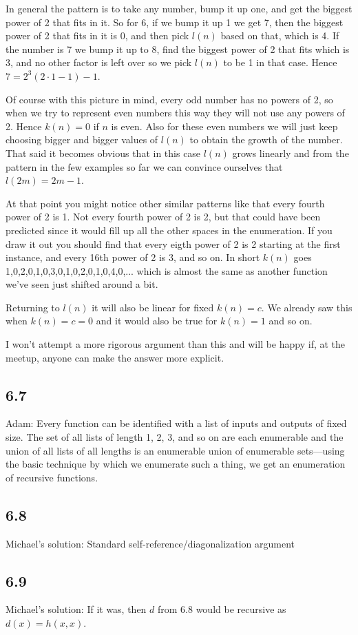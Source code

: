 \documentclass{article}
\renewcommand\ss{\subsection*}
\newcommand\ms{Michael's solution: } %
\begin{document}
    In general the pattern is to take any number, bump it up one, and get
    the biggest power of 2 that fits in it.  So for 6, if we bump it up 1 we get
    7, then the biggest power of 2 that fits in it is 0, and then pick $l(n)$
    based on that, which is 4.  If the number is 7 we bump it up to 8, find the
    biggest power of 2 that fits which is 3, and no other factor is left over
    so we pick $l(n)$ to be 1 in that case.  Hence $7=2^3(2\cdot 1-1)-1$.

    Of course with this picture in mind, every odd number has no powers of 2,
    so when we try to represent even numbers this way they will not use any
    powers of 2.  Hence $k(n)=0$ if $n$ is even.  Also for these even numbers
    we will just keep choosing bigger and bigger values of $l(n)$ to obtain the
    growth of the number.  That said it becomes obvious that in this case $l(n)$
    grows linearly and from the pattern in the few examples so far we can
    convince ourselves that $l(2m)=2m-1$.

    At that point you might notice other similar patterns like that every fourth
    power of 2 is 1.  Not every fourth power of 2 is 2, but that could have
    been predicted since it would fill up all the other spaces in the enumeration.
    If you draw it out you should find that every eigth power of 2 is 2 starting
    at the first instance, and every 16th power of 2 is 3, and so on.  In short
    $k(n)$ goes 1,0,2,0,1,0,3,0,1,0,2,0,1,0,4,0,... which is almost the same as
    another function we've seen just shifted around a bit.

    Returning to $l(n)$ it will also be linear for fixed $k(n)=c$.  We already
    saw this when $k(n)=c=0$ and it would also be true for $k(n)=1$ and so on.

    I won't attempt a more rigorous argument than this and will be happy if, at
    the meetup, anyone can make the answer more explicit.
\ss{6.7} Adam: Every function can be identified with a list of inputs and outputs
    of fixed size.  The set of all lists of length 1, 2, 3, and so on are each
    enumerable and the union of all lists of all lengths is an enumerable union
    of enumerable sets---using the basic technique by which we enumerate such a
    thing, we get an enumeration of recursive functions.
\ss{6.8}
\ms Standard self-reference/diagonalization argument
\ss{6.9}
\ms If it was, then $d$ from 6.8 would be recursive as $d(x) = h(x,x)$.
\end{document}
